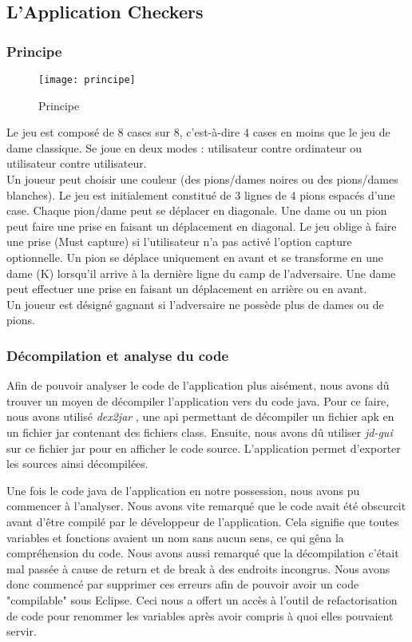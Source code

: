 
\subsection{L'Application Checkers}

\subsubsection{Principe}
\begin{figure}[hp]
	      \begin{center}
			\texttt{[image: principe]}
	      \end{center}
	\caption{Principe}
\end{figure}

Le jeu est composé de 8 cases sur 8, c’est-à-dire 4 cases en moins que le jeu de dame classique.  Se joue en deux modes : utilisateur contre ordinateur ou utilisateur contre utilisateur.\\
Un joueur peut choisir une couleur (des pions/dames noires ou des pions/dames blanches).  Le jeu est initialement constitué de 3 lignes de 4 pions espacés d’une case. Chaque \hbox{pion/dame} peut se déplacer en diagonale. 
Une dame ou un pion peut faire une prise en faisant un déplacement en diagonal. Le jeu oblige à faire une prise (Must capture) si l'utilisateur n'a pas activé l'option capture optionnelle. 
Un pion se déplace uniquement en avant et se transforme en une dame (K) lorsqu’il arrive à la dernière ligne du camp de l’adversaire. Une dame peut effectuer une prise en faisant un déplacement en arrière ou en avant.\\
Un joueur est désigné gagnant si l’adversaire ne possède plus de dames ou de pions.

\subsubsection{Décompilation et analyse du code}

Afin de pouvoir analyser le code de l'application plus aisément, nous avons dû trouver un moyen de décompiler l'application vers du code java.
Pour ce faire, nous avons utilisé \textit{dex2jar} \cite{dex2jar},
une api permettant de décompiler un fichier apk en un fichier jar contenant des fichiers class.
Ensuite, nous avons dû utiliser \textit{jd-gui} \cite{jdgui} sur ce fichier jar pour en afficher le code source.
L'application permet d'exporter les sources ainsi décompilées.

Une fois le code java de l'application en notre possession, nous avons pu commencer à l'analyser.
Nous avons vite remarqué que le code avait été obscurcit avant d'être compilé par le développeur de l'application.
Cela signifie que toutes variables et fonctions avaient un nom sans aucun sens, ce qui gêna la compréhension du code.
Nous avons aussi remarqué que la décompilation c'était mal passée à cause de return et de break à des endroits incongrus.
Nous avons donc commencé par supprimer ces erreurs afin de pouvoir avoir un code "compilable" sous Eclipse.
Ceci nous a offert un accès à l'outil de refactorisation de code pour renommer les variables après avoir compris à quoi elles pouvaient servir.

